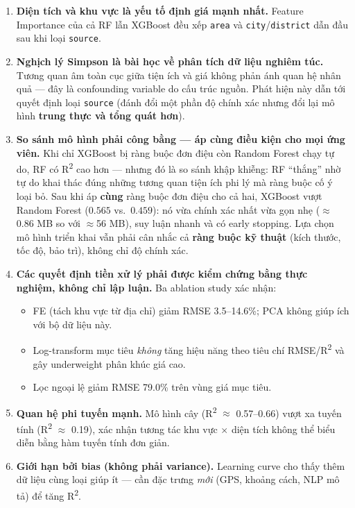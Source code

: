 \begin{enumerate}[leftmargin=*, itemsep=5pt]
  \item \textbf{Diện tích và khu vực là yếu tố định giá mạnh nhất.}
        Feature Importance của cả RF lẫn XGBoost đều xếp \texttt{area}
        và \texttt{city}/\texttt{district} dẫn đầu sau khi loại \texttt{source}.

  \item \textbf{Nghịch lý Simpson là bài học về phân tích dữ liệu nghiêm túc.}
        Tương quan âm toàn cục giữa tiện ích và giá không phản ánh quan hệ nhân quả —
        đây là confounding variable do cấu trúc nguồn.
        Phát hiện này dẫn tới quyết định loại \texttt{source}
        (đánh đổi một phần độ chính xác nhưng đổi lại mô hình \textbf{trung thực và tổng quát hơn}).

  \item \textbf{So sánh mô hình phải công bằng — áp cùng điều kiện cho mọi ứng viên.}
        Khi chỉ XGBoost bị ràng buộc đơn điệu còn Random Forest chạy tự do, RF có
        R\textsuperscript{2} cao hơn — nhưng đó là so sánh khập khiễng: RF ``thắng'' nhờ tự do khai
        thác đúng những tương quan tiện ích phi lý mà ràng buộc cố ý loại bỏ. Sau khi áp
        \textbf{cùng} ràng buộc đơn điệu cho cả hai, XGBoost vượt Random Forest
        ($0.565$ vs.\ $0.459$): nó vừa chính xác nhất vừa gọn nhẹ ($\approx$0.86 MB so với
        $\approx$56 MB), suy luận nhanh và có early stopping. Lựa chọn mô hình triển khai vẫn phải
        cân nhắc cả \textbf{ràng buộc kỹ thuật} (kích thước, tốc độ, bảo trì), không chỉ độ chính xác.

  \item \textbf{Các quyết định tiền xử lý phải được kiểm chứng bằng thực nghiệm, không chỉ lập luận.}
        Ba ablation study xác nhận:
        \begin{itemize}[itemsep=2pt]
          \item FE (tách khu vực từ địa chỉ) giảm RMSE 3.5--14.6\%;
                PCA không giúp ích với bộ dữ liệu này.
          \item Log-transform mục tiêu \textit{không} tăng hiệu năng theo tiêu chí RMSE/R\textsuperscript{2}
                và gây underweight phân khúc giá cao.
          \item Lọc ngoại lệ giảm RMSE 79.0\% trên vùng giá mục tiêu.
        \end{itemize}

  \item \textbf{Quan hệ phi tuyến mạnh.}
        Mô hình cây (R\textsuperscript{2} $\approx$ 0.57--0.66) vượt xa tuyến tính
        (R\textsuperscript{2} $\approx$ 0.19), xác nhận tương tác
        khu vực $\times$ diện tích không thể biểu diễn bằng hàm tuyến tính đơn giản.

  \item \textbf{Giới hạn bởi bias (không phải variance).}
        Learning curve cho thấy thêm dữ liệu cùng loại giúp ít —
        cần đặc trưng \textit{mới} (GPS, khoảng cách, NLP mô tả) để tăng R\textsuperscript{2}.
\end{enumerate}

